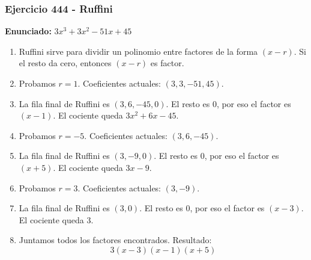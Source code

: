 \documentclass[11pt,a4paper]{article}
\begin{document}
\vspace{0.2cm}
\subsubsection*{Ejercicio 444 - Ruffini}
\textbf{Enunciado:} $ 3 x^{3} + 3 x^{2} - 51 x + 45 $\par
\begin{enumerate}[leftmargin=2em]
\item Ruffini sirve para dividir un polinomio entre factores de la forma \((x-r)\). Si el resto da cero, entonces \((x-r)\) es factor.
\item Probamos \(r=1\). Coeficientes actuales: \((3, 3, -51, 45)\).
\item La fila final de Ruffini es \((3, 6, -45, 0)\). El resto es \(0\), por eso el factor es \((x-1)\). El cociente queda \(3 x^{2} + 6 x - 45\).
\item Probamos \(r=-5\). Coeficientes actuales: \((3, 6, -45)\).
\item La fila final de Ruffini es \((3, -9, 0)\). El resto es \(0\), por eso el factor es \((x+5)\). El cociente queda \(3 x - 9\).
\item Probamos \(r=3\). Coeficientes actuales: \((3, -9)\).
\item La fila final de Ruffini es \((3, 0)\). El resto es \(0\), por eso el factor es \((x-3)\). El cociente queda \(3\).
\item Juntamos todos los factores encontrados. Resultado: \[\boxed{3 \left(x - 3\right) \left(x - 1\right) \left(x + 5\right)}\]
\end{enumerate}

\vspace{0.2cm}
\end{document}
